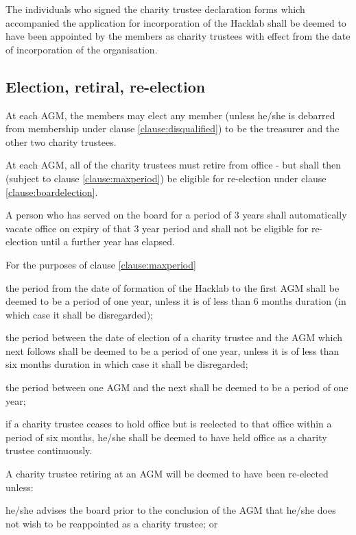 \documentclass{article}
\begin{document}
\clause The individuals who signed the charity trustee declaration
forms which accompanied the application for incorporation of the
Hacklab shall be deemed to have been appointed by the members as
charity trustees with effect from the date of incorporation of the
organisation. 

\subsection{Election, retiral, re-election}

\clause\label{clause:boardelection}At each AGM, the members may elect
any member (unless he/she is debarred from membership under clause
\ref{clause:disqualified}) to be the treasurer and the other two
charity trustees.

\clause At each AGM, all of the charity trustees must retire from
office - but shall then (subject to clause \ref{clause:maxperiod}) be
eligible for re-election under clause \ref{clause:boardelection}.

\clause\label{clause:maxperiod} A person who has served on the board
for a period of 3 years shall automatically vacate office on expiry of
that 3 year period and shall not be eligible for re-election until a
further year has elapsed.

\clause For the purposes of clause \ref{clause:maxperiod}

\subclause the period from the date of formation of the Hacklab to the
first AGM shall be deemed to be a period of one year, unless it is of
less than 6 months duration (in which case it shall be disregarded);

\subclause the period between the date of election of a charity
trustee and the AGM which next follows shall be deemed to be a period
of one year, unless it is of less than six months duration in which
case it shall be disregarded; 

\subclause the period between one AGM and the next shall be deemed to
be a period of one year;

\subclause if a charity trustee ceases to hold office but is
reelected to that office within a period of six months, he/she shall
be deemed to have held office as a charity trustee continuously.

\clause A charity trustee retiring at an AGM will be deemed to have
been re-elected unless:

\subclause he/she advises the board prior to the conclusion of the AGM
that he/she does not wish to be reappointed as a charity trustee; or
\end{document}
